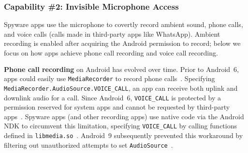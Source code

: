 
\subsubsection*{Capability \#2: Invisible Microphone Access}
\label{subsubsec:audio_recording}
Spyware apps use the microphone to covertly record
ambient sound, phone calls,
and voice calls (calls made in third-party apps like WhatsApp).
Ambient recording is enabled after acquiring the Android permission
to record; below we focus on how apps achieve phone call recording and voice call
recording.

\textbf{Phone call recording} on Android has evolved over time.
%
Prior to Android~6, apps could easily use \texttt{MediaRecorder} to
record phone calls~\cite{MediaRec53:online}.
Specifying \texttt{MediaRecorder.AudioSource.VOICE\_CALL},
an app can receive both uplink and downlink audio
for a call. Since Android~6, \texttt{VOICE\_CALL} is protected by a permission
reserved for system apps and cannot be requested by third-party
apps~\cite{VOICECAL55:online}. Spyware apps (and other recording apps) use
native code via the Android NDK to circumvent this limitation, specifying
\texttt{VOICE\_CALL} by calling functions defined in
\texttt{libmedia.so}~\cite{ViktorDe77:online}.
Android~9 subsequently prevented this workaround by filtering out
unauthorized attempts to set \texttt{AudioSource}~\cite{coplukAC3:online,
  services10:online}.

